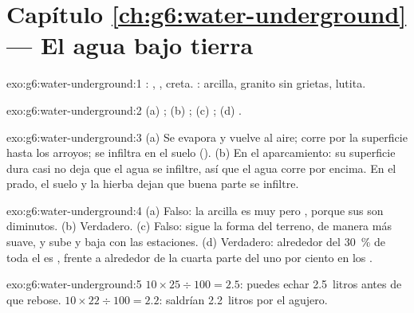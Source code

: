 \section*{Capítulo \ref{ch:g6:water-underground} --- El agua bajo tierra}

\begin{solution}{exo:g6:water-underground:1}
: , , creta. : arcilla, granito sin
grietas, lutita.
\end{solution}

\begin{solution}{exo:g6:water-underground:2}
(a) ; (b) ; (c) ; (d) .
\end{solution}

\begin{solution}{exo:g6:water-underground:3}
(a) Se evapora y vuelve al aire; corre por la superficie hasta los arroyos;
se infiltra en el suelo (). (b) En el aparcamiento: su
superficie dura casi no deja que el agua se infiltre, así que el agua corre
por encima. En el prado, el suelo y la hierba dejan que buena parte se
infiltre.
\end{solution}

\begin{solution}{exo:g6:water-underground:4}
(a) Falso: la arcilla es muy  pero , porque sus  son
diminutos. (b) Verdadero. (c) Falso: sigue la forma del terreno, de manera
más suave, y sube y baja con las estaciones. (d) Verdadero: alrededor del
30~\% de toda el  es , frente a alrededor de la
cuarta parte del uno por ciento en los .
\end{solution}

\begin{solution}{exo:g6:water-underground:5}
$10 \times 25 \div 100 = 2.5$: puedes echar 2.5~litros antes de que rebose.
$10 \times 22 \div 100 = 2.2$: saldrían 2.2~litros por el agujero.
\end{solution}

